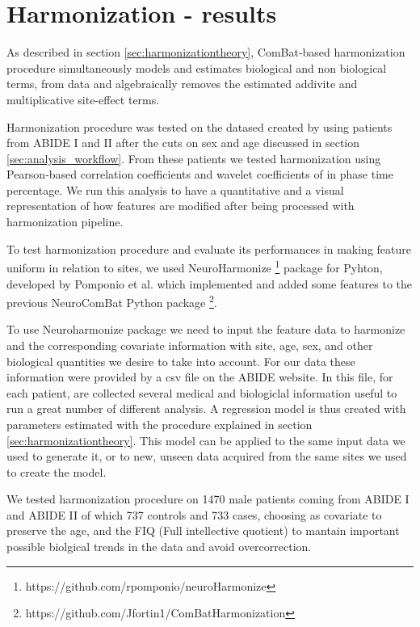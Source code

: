 \documentclass[11pt]{report}
\begin{document}
\chapter{Harmonization - results}\label{chap:harmonization_results}

As described in section \ref{sec:harmonizationtheory}, ComBat-based harmonization procedure simultaneously models and estimates biological and non biological terms, from data and algebraically removes the estimated addivite and multiplicative site-effect terms.

Harmonization procedure was tested on the datased created by using patients from ABIDE I and II after the cuts on sex and age discussed in section \ref{sec:analysis_workflow}.
From these patients we tested harmonization using Pearson-based correlation coefficients and wavelet coefficients of in phase time percentage.
We run this analysis to have a quantitative and a visual representation of how features are modified after being processed with harmonization pipeline.

To test harmonization procedure and evaluate its performances in making feature uniform in relation to sites, we used NeuroHarmonize \footnote{https://github.com/rpomponio/neuroHarmonize} package for Pyhton, developed by Pomponio et al. \cite{pomponio-2019} which implemented and added some features to the previous NeuroComBat Python package \footnote{https://github.com/Jfortin1/ComBatHarmonization}.

To use Neuroharmonize package we need to input the feature data to harmonize and the corresponding covariate information with site, age, sex, and other biological quantities we desire to take into account.
For our data these information were provided by a csv file on the ABIDE website. In this file, for each patient, are collected several medical and biologiclal information useful to run a great number of different analysis.
A regression model is thus created with parameters estimated with the procedure explained in section \ref{sec:harmonizationtheory}. This model can be applied to the same input data we used to generate it, or to new, unseen data acquired from the same sites we used to create the model.

We tested harmonization procedure on 1470 male patients coming from ABIDE I and ABIDE II of which 737 controls and 733 cases, choosing as covariate to preserve the age, and the FIQ (Full intellective quotient) to mantain important possible biolgical trends in the data and avoid overcorrection.
\end{document}
